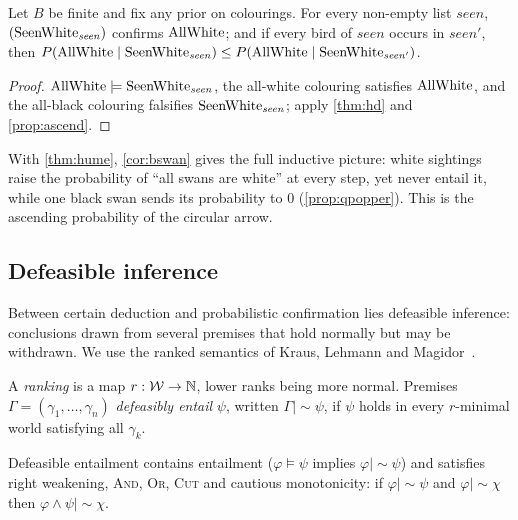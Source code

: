 \begin{corollary}\label{cor:bswan}
Let $B$ be finite and fix any prior on colourings. For every non-empty list $\mathit{seen}$,
$(\mathrm{SeenWhite}_{\mathit{seen}})$ confirms $\mathrm{AllWhite}$; and if every bird of $\mathit{seen}$ occurs in
$\mathit{seen}'$, then $P(\mathrm{AllWhite}\mid\mathrm{SeenWhite}_{\mathit{seen}})\le P(\mathrm{AllWhite}\mid\mathrm{SeenWhite}_{\mathit{seen}'})$.
\end{corollary}

\begin{proof}
$\mathrm{AllWhite}\models\mathrm{SeenWhite}_{\mathit{seen}}$, the all-white colouring satisfies $\mathrm{AllWhite}$, and the all-black
colouring falsifies $\mathrm{SeenWhite}_{\mathit{seen}}$; apply \cref{thm:hd} and \cref{prop:ascend}.
\end{proof}

With \cref{thm:hume}, \cref{cor:bswan} gives the full inductive picture: white sightings raise the
probability of ``all swans are white'' at every step, yet never entail it, while one black swan
sends its probability to $0$ (\cref{prop:qpopper}). This is the ascending probability of the
circular arrow.

\subsection{Defeasible inference}\label{sec:defeasible}

Between certain deduction and probabilistic confirmation lies defeasible inference: conclusions
drawn from several premises that hold normally but may be withdrawn. We use the ranked semantics
of Kraus, Lehmann and Magidor~\cite{klm}.

\begin{definition}\label{def:normally}
A \emph{ranking} is a map $r:\mathcal W\to\mathbb N$, lower ranks being more normal. Premises
$\Gamma=(\gamma_1,\dots,\gamma_n)$ \emph{defeasibly entail} $\psi$, written $\Gamma\mathrel{|\!\sim}\psi$,
if $\psi$ holds in every $r$-minimal world satisfying all $\gamma_k$.
\end{definition}

\begin{theorem}\label{thm:klm}
Defeasible entailment contains entailment ($\varphi\models\psi$ implies
$\varphi\mathrel{|\!\sim}\psi$) and satisfies right weakening, \textup{\textsc{And}}, \textup{\textsc{Or}},
\textup{\textsc{Cut}} and cautious monotonicity: if $\varphi\mathrel{|\!\sim}\psi$ and
$\varphi\mathrel{|\!\sim}\chi$ then $\varphi\wedge\psi\mathrel{|\!\sim}\chi$.
\end{theorem}

